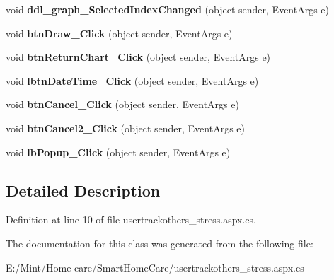 \begin{DoxyCompactItemize}
\item 
\hypertarget{classusertrackothers__stress_ada531a2f924489e2d9739779b772b9cd}{void {\bfseries ddl\-\_\-graph\-\_\-\-Selected\-Index\-Changed} (object sender, Event\-Args e)}\label{classusertrackothers__stress_ada531a2f924489e2d9739779b772b9cd}

\item 
\hypertarget{classusertrackothers__stress_a2a087e739c4fe72098427b6f30f505ee}{void {\bfseries btn\-Draw\-\_\-\-Click} (object sender, Event\-Args e)}\label{classusertrackothers__stress_a2a087e739c4fe72098427b6f30f505ee}

\item 
\hypertarget{classusertrackothers__stress_a6ecaa078026d6dfff47ca5de9ae9c0c8}{void {\bfseries btn\-Return\-Chart\-\_\-\-Click} (object sender, Event\-Args e)}\label{classusertrackothers__stress_a6ecaa078026d6dfff47ca5de9ae9c0c8}

\item 
\hypertarget{classusertrackothers__stress_ac83cca577a60935d7c26b9d5594fd570}{void {\bfseries lbtn\-Date\-Time\-\_\-\-Click} (object sender, Event\-Args e)}\label{classusertrackothers__stress_ac83cca577a60935d7c26b9d5594fd570}

\item 
\hypertarget{classusertrackothers__stress_a29692c925af3c8f146e7594d80cb6ed6}{void {\bfseries btn\-Cancel\-\_\-\-Click} (object sender, Event\-Args e)}\label{classusertrackothers__stress_a29692c925af3c8f146e7594d80cb6ed6}

\item 
\hypertarget{classusertrackothers__stress_a452886e295b77a716aee1ec7aaaccfbb}{void {\bfseries btn\-Cancel2\-\_\-\-Click} (object sender, Event\-Args e)}\label{classusertrackothers__stress_a452886e295b77a716aee1ec7aaaccfbb}

\item 
\hypertarget{classusertrackothers__stress_a62209eeba6a6ba55c798c38a72aaa948}{void {\bfseries lb\-Popup\-\_\-\-Click} (object sender, Event\-Args e)}\label{classusertrackothers__stress_a62209eeba6a6ba55c798c38a72aaa948}

\end{DoxyCompactItemize}


\subsection{Detailed Description}


Definition at line 10 of file usertrackothers\-\_\-stress.\-aspx.\-cs.



The documentation for this class was generated from the following file\-:\begin{DoxyCompactItemize}
\item 
E\-:/\-Mint/\-Home care/\-Smart\-Home\-Care/usertrackothers\-\_\-stress.\-aspx.\-cs\end{DoxyCompactItemize}
